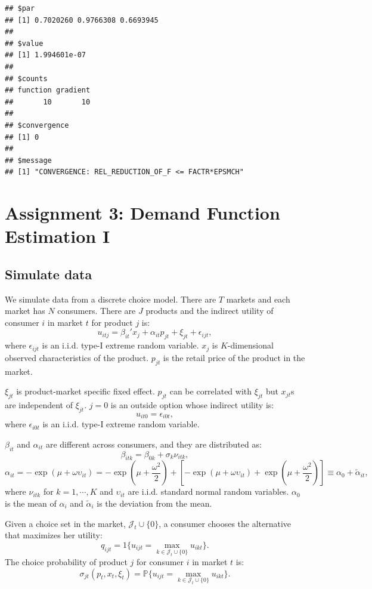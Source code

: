 \documentclass[
]{book}
\begin{document}
\begin{verbatim}
## $par
## [1] 0.7020260 0.9766308 0.6693945
## 
## $value
## [1] 1.994601e-07
## 
## $counts
## function gradient 
##       10       10 
## 
## $convergence
## [1] 0
## 
## $message
## [1] "CONVERGENCE: REL_REDUCTION_OF_F <= FACTR*EPSMCH"
\end{verbatim}

\hypertarget{assignment3}{%
\chapter{Assignment 3: Demand Function Estimation I}\label{assignment3}}

\hypertarget{simulate-data-2}{%
\section{Simulate data}\label{simulate-data-2}}

We simulate data from a discrete choice model. There are \(T\) markets and each market has \(N\) consumers. There are \(J\) products and the indirect utility of consumer \(i\) in market \(t\) for product \(j\) is:
\[
u_{itj} = \beta_{it}' x_j + \alpha_{it} p_{jt} + \xi_{jt} + \epsilon_{ijt},
\]
where \(\epsilon_{ijt}\) is an i.i.d. type-I extreme random variable. \(x_j\) is \(K\)-dimensional observed characteristics of the product. \(p_{jt}\) is the retail price of the product in the market.

\(\xi_{jt}\) is product-market specific fixed effect. \(p_{jt}\) can be correlated with \(\xi_{jt}\) but \(x_{jt}\)s are independent of \(\xi_{jt}\). \(j = 0\) is an outside option whose indirect utility is:
\[
u_{it0} = \epsilon_{i0t},
\]
where \(\epsilon_{i0t}\) is an i.i.d. type-I extreme random variable.

\(\beta_{it}\) and \(\alpha_{it}\) are different across consumers, and they are distributed as:
\[
\beta_{itk} = \beta_{0k} + \sigma_k \nu_{itk},
\]
\[
\alpha_{it} = - \exp(\mu + \omega \upsilon_{it}) = - \exp(\mu + \frac{\omega^2}{2}) + [- \exp(\mu + \omega \upsilon_{it}) + \exp(\mu + \frac{\omega^2}{2})] \equiv \alpha_0 + \tilde{\alpha}_{it},
\]
where \(\nu_{itk}\) for \(k = 1, \cdots, K\) and \(\upsilon_{it}\) are i.i.d. standard normal random variables. \(\alpha_0\) is the mean of \(\alpha_i\) and \(\tilde{\alpha}_i\) is the deviation from the mean.

Given a choice set in the market, \(\mathcal{J}_t \cup \{0\}\), a consumer chooses the alternative that maximizes her utility:
\[
q_{ijt} = 1\{u_{ijt} = \max_{k \in \mathcal{J}_t \cup \{0\}} u_{ikt}\}.
\]
The choice probability of product \(j\) for consumer \(i\) in market \(t\) is:
\[
\sigma_{jt}(p_t, x_t, \xi_t) = \mathbb{P}\{u_{ijt} = \max_{k \in \mathcal{J}_t \cup \{0\}} u_{ikt}\}.
\]
\end{document}
